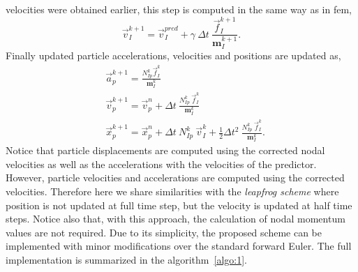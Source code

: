 \documentclass[preprint,12pt,a4paper]{elsarticle}
\newcommand{\tens}[1]{
  \ensuremath{\mathbf{{#1}}}
}
\begin{document}
velocities were obtained earlier, this step is computed in the same way as
in \acrshort{fem},
\begin{equation}
  \label{eq:Corrector-velocity}
  \vec{v}_{I}^{k+1} = \vec{v}_{I}^{pred} + \gamma\ \Delta t\ \frac{\vec{f}_{I}^{k+1}}{\tens{m}_I^{k+1}}.
\end{equation}
Finally updated particle accelerations, velocities and positions are updated as,
\begin{align}
  \label{eq:Update-lagrangian-pce}
        &\vec{a}_p^{k+1} = \frac{N_{Ip}^k\vec{f}_{I}^{k}}{\tens{m}_I^k}\\
      &\vec{v}_p^{k+1} = \vec{v}_p^n + \Delta t\
        \frac{N_{Ip}^k\
        \vec{f}_{I}^{k}}{\tens{m}_I^k}\\
      &\vec{x}_p^{k+1} = \vec{x}_p^n + \Delta t\
         N_{Ip}^k\ \vec{v}_{I}^{k} +
        \frac{1}{2}\Delta t^2\ \frac{N_{Ip}^k\
        \vec{f}_{I}^{k}}{\tens{m}_I^k}.
\end{align}
Notice that particle displacements are computed using the corrected
nodal velocities as well as the accelerations with the velocities
of the predictor. However, particle velocities and accelerations
are computed using the corrected velocities. Therefore here we share similarities
with the \textit{leapfrog scheme} where position is not updated at
full time step, but the velocity is updated at half time steps. Notice
also that, with this approach, the calculation of nodal momentum values
are not required. Due to its simplicity, the proposed scheme can be implemented with minor modifications
over the standard forward Euler. The full implementation is summarized in the algorithm~\ref{algo:1}.
\end{document}
